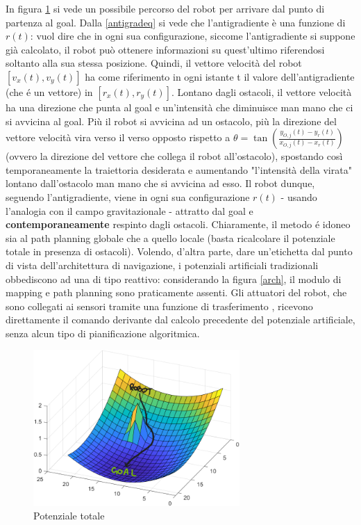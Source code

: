 \documentclass[14pt,a4paper]{extarticle}
\begin{document}
In figura \ref{pot} si vede un possibile percorso del robot per arrivare dal punto di partenza al goal. Dalla \ref{antigradeq} si vede che l'antigradiente è una funzione di \(r(t)\): vuol dire che in ogni sua configurazione, siccome l'antigradiente si suppone già calcolato, il robot può ottenere informazioni su quest'ultimo riferendosi soltanto alla sua stessa posizione. Quindi, il vettore velocità del robot \([v_x(t) , v_y(t)]\) ha come riferimento in ogni istante t il valore dell'antigradiente (che é un vettore) in \([r_x(t),r_y(t)]\). Lontano dagli ostacoli, il vettore velocità ha una direzione che punta al goal e un'intensità che diminuisce man mano che ci si avvicina al goal. Più il robot si avvicina ad un ostacolo, più la direzione del vettore velocità vira verso il verso opposto rispetto a \(\theta = \tan \left( \frac{y_{O,j}(t)-y_r(t)}{x_{O,j}(t)-x_r(t)} \right) \) (ovvero la direzione del vettore che collega il robot all'ostacolo), spostando così temporaneamente la traiettoria desiderata e aumentando "l'intensità della virata" lontano dall'ostacolo man mano che si avvicina ad esso. Il robot dunque, seguendo l'antigradiente, viene in ogni sua configurazione \(r(t)\) - usando l'analogia con il campo gravitazionale - attratto dal goal e \textbf{contemporaneamente} respinto dagli ostacoli. Chiaramente, il metodo é idoneo sia al path planning globale che a quello locale (basta ricalcolare il potenziale totale in presenza di ostacoli). Volendo, d'altra parte, dare un'etichetta dal punto di vista dell'architettura di navigazione, i potenziali artificiali tradizionali obbediscono ad una di tipo reattivo: considerando la figura \ref{arch}, il modulo di mapping e path planning sono praticamente assenti. Gli attuatori del robot, che sono collegati ai sensori tramite una funzione di trasferimento \cite{kim}, ricevono direttamente il comando derivante dal calcolo precedente del potenziale artificiale, senza alcun tipo di pianificazione algoritmica. 

\begin{figure}[H]
\centering
\caption{Potenziale totale}
\label{pot}
\includegraphics[width=0.7\textwidth]{pot.png}
\end{figure}
\end{document}
